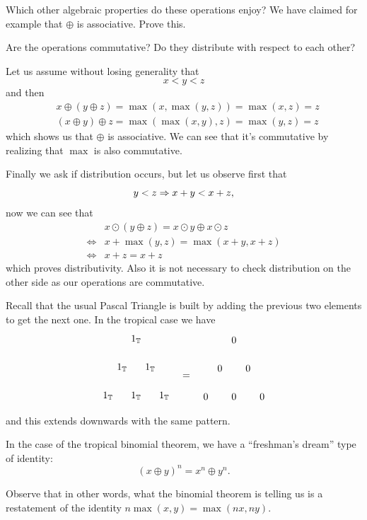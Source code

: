 \documentclass[12pt]{memoir}
\theoremstyle{definition}
\begin{document}
\begin{Ej}[2-]
Which other algebraic properties do these operations enjoy? We have claimed for example that $\oplus$ is associative. Prove this.\par 
Are the operations commutative? Do they distribute with respect to each other?
\end{Ej}

\begin{ptcb}
Let us assume without losing generality that 
$$x<y<z$$
and then 
\begin{align*}
    &x\oplus (y\oplus z)=\max(x,\max(y,z))=\max(x,z)=z\\
    &(x\oplus y)\oplus z=\max(\max(x,y),z)=\max(y,z)=z
\end{align*}
which shows us that $\oplus$ is associative. We can see that it's commutative by realizing that $\max$ is also commutative.\par 
Finally we ask if distribution occurs, but let us observe first that 
$$y<z\Rightarrow x+y<x+z,$$
now we can see that 
\begin{align*}
&x\odot(y\oplus z)=x\odot y\oplus x\odot z\\
\iff &x+\max(y,z)=\max(x+y,x+z)\\
\iff &x+z=x+z
\end{align*}
which proves distributivity. Also it is not necessary to check distribution on the other side as our operations are commutative.
\end{ptcb}

\begin{Prop}
Recall that the usual Pascal Triangle is built by adding the previous two elements to get the next one. In the tropical case we have 
$$
\begin{tikzpicture}
    \foreach \n in {0,...,2} {
      \foreach \k in {0,...,\n} {
        \node at (\k-\n/2,-\n) {$1_\bT$};
      }
    }
    \end{tikzpicture}
    \word{\raisebox{2.5em}{=}}%
    \begin{tikzpicture}
        \foreach \n in {0,...,2} {
          \foreach \k in {0,...,\n} {
            \node at (\k-\n/2,-\n) {$0$};
          }
        }
        \end{tikzpicture}
    $$
    and this extends downwards with the same pattern.\par 
    In the case of the tropical binomial theorem, we have a ``freshman's dream'' type of identity:
    $$(x\oplus y)^n=x^n\oplus y^n.$$

Observe that in other words, what the binomial theorem is telling us is a restatement of the identity $n\max(x,y)=\max(nx,ny)$.
\end{Prop}
\end{document}
